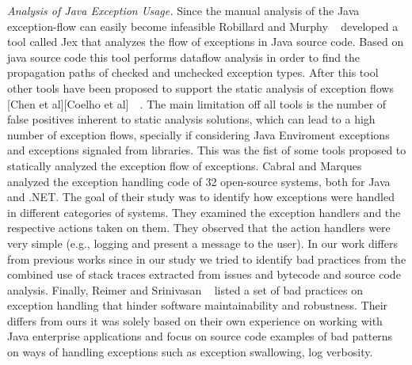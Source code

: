 \documentclass[conference]{IEEEtran}
\begin{document}
\textit{Analysis of Java Exception Usage.} Since the manual analysis of the Java exception-flow can easily become infeasible Robillard and Murphy ~\cite{} developed a tool called Jex that analyzes the flow of exceptions in Java source code. Based on java source code this tool performs dataflow analysis in order to find the propagation paths of checked and unchecked exception types. After this tool other tools have been proposed to support the static analysis of exception flows [Chen et al][Coelho et al]~\cite{}~\cite{}. The main limitation off all tools is the number of false positives inherent to static analysis solutions, which can lead to a high number of exception flows, specially if considering Java Enviroment exceptions and exceptions signaled from libraries. This was the fist of some tools proposed to statically analyzed the exception flow of exceptions. Cabral and Marques ~\cite{cabral2007exception} analyzed the exception handling code of 32 open-source systems, both for Java and .NET. The goal of their study was to identify how exceptions were handled in different categories of systems. They examined the exception handlers and the respective actions taken on them. They observed that the action handlers were very simple (e.g., logging and present a message to the user). In our work differs from previous works since in our study we tried to identify bad practices from the combined use of stack traces extracted from issues and bytecode and source code analysis. Finally, Reimer and Srinivasan ~\cite{reimer2003analyzing} listed a set of bad practices on exception handling that hinder software maintainability and robustness. Their differs from ours it was solely based on their own experience on working with Java enterprise applications and focus on source code examples of bad patterns on ways of handling exceptions such as exception swallowing, log verbosity.
\end{document}
